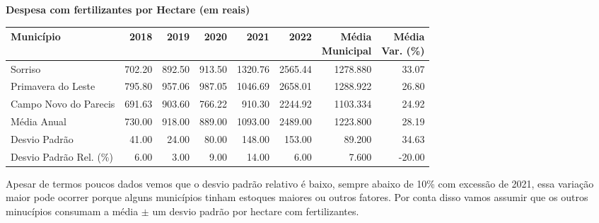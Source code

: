 \documentclass{article}
\begin{document}
\begin{center}
\textbf{Despesa com fertilizantes por Hectare (em reais)}
\begin{tabular}[10pt]{|l|rrrrrrr|}
\hline
Município &    2018 &    2019 &    2020 &     2021 &     2022 &  \parbox[c]{1.5cm}{Média \\ Municipal} &  \parbox[c]{1.5cm}{Média \\ Var. (\%)} \\
\hline
Sorriso                &  702.20 &  892.50 &  913.50 &  1320.76 &  2565.44 &    1278.880 &           33.07 \\
Primavera do Leste     &  795.80 &  957.06 &  987.05 &  1046.69 &  2658.01 &    1288.922 &           26.80 \\
Campo Novo do Parecis  &  691.63 &  903.60 &  766.22 &   910.30 &  2244.92 &    1103.334 &           24.92 \\ \hline
Média Anual            &  730.00 &  918.00 &  889.00 &  1093.00 &  2489.00 &    1223.800 &           28.19 \\
Desvio Padrão          &   41.00 &   24.00 &   80.00 &   148.00 &   153.00 &      89.200 &           34.63 \\
Desvio Padrão Rel. (\%) &    6.00 &    3.00 &    9.00 &    14.00 &     6.00 &       7.600 &          -20.00 \\
\hline
\end{tabular}
\end{center}
Apesar de termos poucos dados vemos que o desvio padrão relativo é baixo, sempre abaixo de 10\% com excessão de 2021, essa variação maior pode ocorrer porque alguns municípios tinham estoques maiores ou outros fatores. Por conta disso vamos assumir que os outros minucípios consumam a média  $\pm$ um desvio padrão por hectare com fertilizantes.
\end{document}
